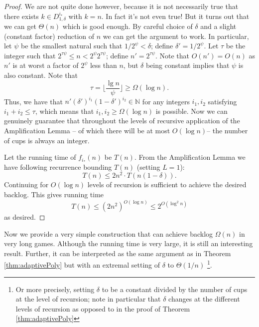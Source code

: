 \documentclass[twocolumn]{article}[10pt]
\begin{document}
\begin{proof}
  We are not quite done however, because it is not necessarily
  true that there exists $k \in D^{i_*}_{1,\delta}$ with $k = n.$
  In fact it's not even true! But it turns out that we can get
  $\Theta(n)$ which is good enough. By
  careful choice of $\delta$ and a slight (constant factor) reduction of $n$ we can get the
  argument to work. In particular, let $\psi$ be the smallest natural such that
  $1/2^\psi < \delta$; define $\delta' = 1/2^\psi$. Let $\tau$ be the integer
  such that $2^{\tau \psi} \le n < 2^\psi 2^{\tau \psi}$; define $n' =
  2^{\tau\psi}$. Note that $O(n') = O(n)$ as $n'$ is at worst a factor of
  $2^\psi$ less than $n$, but $\delta$ being constant implies that $\psi$ is
  also constant. Note that $$\tau = \Big\lfloor \frac{\lg n}{\psi} \Big\rfloor \ge \Omega(\log n).$$
  Thus, we have that $n'(\delta')^{i_1}(1-\delta')^{i_2} \in \mathbb{N}$ for any
  integers $i_1,i_2$ satisfying $i_1+i_2 \le \tau$, which means
  that $i_1,i_2\ge \Omega(\log n)$ is possible.
  Now we can genuinely guarantee that throughout the levels of recursive application of
  the Amplification Lemma -- of which there will be at most $O(\log n)$-- the
  number of cups is always an integer. 

  Let the running time of $f_{i_*}(n)$ be $T(n)$. From the Amplification Lemma we have 
  following recurrence bounding $T(n)$ (setting $L=1$):
  $$T(n) \le 2n^2 \cdot T(n(1-\delta)).$$
  Continuing for $O(\log n)$ levels of recursion is sufficient to
  achieve the desired backlog. This gives running time
  $$T(n) \le (2n^2)^{O(\log n)} \le 2^{O(\log^2 n)}$$
  as desired.

\end{proof}

Now we provide a very simple construction that can achieve backlog $\Omega(n)$
in very long games. Although the running time is very large, it is
still an interesting result. Further, it can be interpreted as the same
argument as in Theorem \ref{thm:adaptivePoly} but with an extremal setting of
$\delta$ to $\Theta(1/n)$ \footnote{Or more precisely, setting $\delta$ to
be a constant divided by the number of cups at the level of
recursion; note in particular that $\delta$ changes at the
different levels of recursion as opposed to in the proof of
Theorem \ref{thm:adaptivePoly}}.
\end{document}
